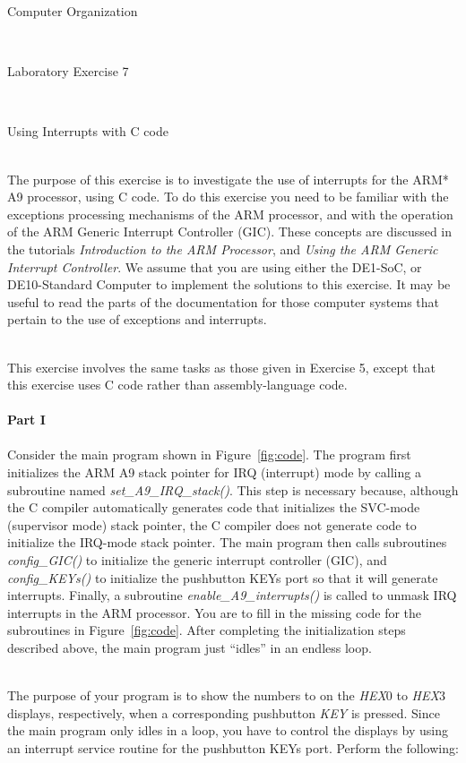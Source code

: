 \documentclass[epsfig,10pt,fullpage]{article}
\newcommand{\LabNum}{7}
\begin{document}
\centerline{\huge Computer Organization}
~\\
\centerline{\huge Laboratory Exercise \LabNum}
~\\
\centerline{\large Using Interrupts with C code}
~\\

\noindent
The purpose of this exercise is to investigate the use of interrupts for the ARM* A9
processor, using C code. To do this exercise you need to be familiar with
the exceptions processing mechanisms of the ARM processor, and with the operation of
the ARM Generic Interrupt Controller (GIC). These concepts are discussed in the tutorials 
{\it Introduction to the ARM Processor}, and {\it Using the ARM Generic Interrupt
Controller}. We assume that you are using either the DE1-SoC, or DE10-Standard Computer
to implement the solutions to this exercise. It may be useful to read the parts of the 
documentation for those computer systems that pertain to the use of exceptions and interrupts.

~\\
\noindent
This exercise involves the same tasks as those given in Exercise 5,
except that this exercise uses C code rather than assembly-language code.
~\\
~\\
\noindent
{\bf Part I}
~\\
~\\
\noindent
Consider the main program shown in Figure~\ref{fig:code}. The program first initializes the
ARM A9 stack pointer for IRQ (interrupt) mode by calling a subroutine named
{\it set\_A9\_IRQ\_stack()}. This step is necessary because, although
the C compiler automatically generates code that initializes the SVC-mode (supervisor mode)
stack pointer, the C compiler does not generate code to initialize the IRQ-mode stack pointer.
The main program then calls subroutines {\it config\_GIC()} to initialize the generic 
interrupt controller (GIC), and {\it config\_KEYs()} to initialize the pushbutton KEYs 
port so that it will generate interrupts. 
Finally, a subroutine {\it enable\_A9\_interrupts()} is called to unmask
IRQ interrupts in the ARM processor. You are to fill in the missing code for the 
subroutines in Figure~\ref{fig:code}. After completing the initialization steps
described above, the main program just ``idles'' in an endless loop.

~\\
\noindent
The purpose of your program is to show the numbers  to  on the {\it HEX}0
to {\it HEX}3 displays, respectively, when a corresponding pushbutton {\it KEY} is pressed. 
Since the main program only idles in a loop, you have to control the displays by using an 
interrupt service routine for the pushbutton KEYs port.  Perform the following:
\end{document}

